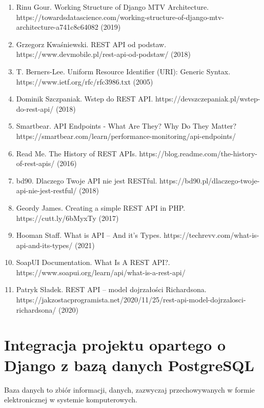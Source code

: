 \documentclass[oneside,polski,logo,indent]{amuthesis}
\begin{document}
\begin{enumerate}
\begin{enumerate}
\begin{enumerate}[leftmargin=5pt,rightmargin=5pt]
\item Rinu Gour. Working Structure of Django MTV Architecture. https://towardsdatascience.com/working-structure-of-django-mtv-architecture-a741c8c64082 (2019)

\item Grzegorz Kwaśniewski. REST API od podstaw. https://www.devmobile.pl/rest-api-od-podstaw/ (2018)

\item T. Berners-Lee. Uniform Resource Identifier (URI): Generic Syntax. https://www.ietf.org/rfc/rfc3986.txt (2005)

\item Dominik Szczpaniak. Wstep do REST API. https://devszczepaniak.pl/wstep-do-rest-api/ (2018)

\item Smartbear. API Endpoints - What Are They? Why Do They Matter? https://smartbear.com/learn/performance-monitoring/api-endpoints/

\item Read Me. The History of REST APIs. https://blog.readme.com/the-history-of-rest-apis/ (2016)

\item bd90. Dlaczego Twoje API nie jest RESTful. https://bd90.pl/dlaczego-twoje-api-nie-jest-restful/ (2018)

\item Geordy James. Creating a simple REST API in PHP. https://cutt.ly/6bMyxTy (2017)

\item Hooman Staff. What is API – And it’s Types. https://techrevv.com/what-is-api-and-its-types/ (2021)

\item SoapUI Documentation. What Is A REST API?. https://www.soapui.org/learn/api/what-is-a-rest-api/

\item Patryk Sładek. REST API – model dojrzałości Richardsona. https://jakzostacprogramista.net/2020/11/25/rest-api-model-dojrzalosci-richardsona/ (2020)
\end{enumerate}

\chapter{Integracja projektu opartego o Django z bazą danych PostgreSQL}
Baza danych to zbiór informacji, danych, zazwyczaj przechowywanych w formie elektronicznej w systemie komputerowych.  


\end{enumerate}
\end{enumerate}
\end{document}
